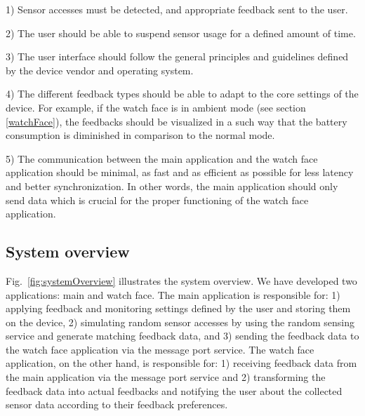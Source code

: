 \documentclass[conference, a4paper, 10pt, twocolumn]{IEEEtran}
\begin{document}
1) Sensor accesses must be detected, and appropriate feedback sent to the user.

2) The user should be able to suspend sensor usage for a defined amount of time.

3) The user interface should follow the general principles and guidelines defined by the device vendor and operating system.

4) The different feedback types should be able to adapt to the core settings of the device. For example, if the watch face is in ambient mode (see section \ref{watchFace}), the feedbacks should be visualized in a such way that the battery consumption is diminished in comparison to the normal mode. 

5) The communication between the main application and the watch face application should be minimal, as fast and as efficient as possible for less latency and better synchronization. In other words, the main application should only send data which is crucial for the proper functioning of the watch face application.  

\subsection{\textbf{System overview}}

Fig.~\ref{fig:systemOverview} illustrates the system overview. We have developed two applications: main and watch face. The main application is responsible for: 1) applying feedback and monitoring settings defined by the user and storing them on the device, 2) simulating random sensor accesses by using the random sensing service and generate matching feedback data, and 3) sending the feedback data to the watch face application via the message port service. The watch face application, on the other hand, is responsible for: 1) receiving feedback data from the main application via the message port service and 2) transforming the feedback data into actual feedbacks and notifying the user about the collected sensor data according to their feedback preferences.
\end{document}
